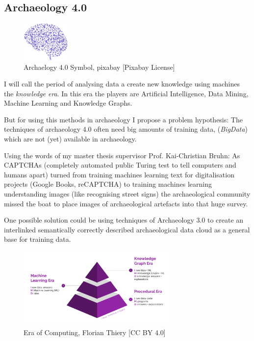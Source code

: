 \documentclass[twocolumn]{autart}
\begin{document}
\subsection{Archaeology 4.0}

\begin{figure}[!htb]
\begin{center}
\includegraphics[height=2cm]{a40.png}   
\caption{Archaelogy 4.0 Symbol, pixabay [Pixabay License]}  
\label{figa40symbol}                         
\end{center}                             
\end{figure}

I will call the period of analysing data a create new knowledge using machines the \textit{knowledge era}. In this era the players are Artificial Intelligence, Data Mining, Machine Learning and Knowledge Graphs.

But for using this methods in archaeology I propose a problem hypothesis: The techniques of archaeology 4.0 often need big amounts of training data, (\textit{BigData}) which are not (yet) available in archaeology.

Using the words of my master thesis supervisor Prof. Kai-Christian Bruhn: As CAPTCHAs (completely automated public Turing test to tell computers and humans apart) turned from training machines learning text for digitalisation projects (Google Books, reCAPTCHA) to training machines learning understanding images (like recognising street signs) the archaeological community missed the boat to place images of archaeological artefacts into that huge survey.

One possible solution could be using techniques of Archaeology 3.0 to create an interlinked semantically correctly described archaeological data cloud as a general base for training data.

\begin{figure}[!htb]
\begin{center}
\includegraphics[width=8cm]{Era_of_Computing.png}  
\caption{Era of Computing, Florian Thiery [CC BY 4.0]}  
\label{figeoc}                             
\end{center}                               
\end{figure}
\end{document}
